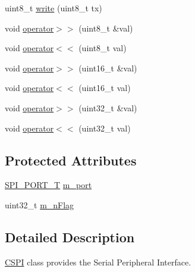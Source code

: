 \begin{DoxyCompactItemize}
\item 
uint8\-\_\-t \hyperlink{class_c_s_p_i_a2b91318925ae9de3f295abd2418285c4}{write} (uint8\-\_\-t tx)
\item 
void \hyperlink{class_c_s_p_i_a24ca202a0494b84a92ff56d10725ce40}{operator$>$$>$} (uint8\-\_\-t \&val)
\item 
void \hyperlink{class_c_s_p_i_a3ce438bee4e3c087e44b3cf2b1690ecd}{operator$<$$<$} (uint8\-\_\-t val)
\item 
void \hyperlink{class_c_s_p_i_ac53ab106be8d0f369b349f82b3db6813}{operator$>$$>$} (uint16\-\_\-t \&val)
\item 
void \hyperlink{class_c_s_p_i_a272f5e518d21194dbc996f5f5475ae02}{operator$<$$<$} (uint16\-\_\-t val)
\item 
void \hyperlink{class_c_s_p_i_aaf1a92290aaee5a93f8fc2db9ce4a512}{operator$>$$>$} (uint32\-\_\-t \&val)
\item 
void \hyperlink{class_c_s_p_i_a4d0cd48d0bba271fd72df43d7528e2a0}{operator$<$$<$} (uint32\-\_\-t val)
\end{DoxyCompactItemize}
\subsection*{Protected Attributes}
\begin{DoxyCompactItemize}
\item 
\hyperlink{group___enumerations_ga1adbe6bf70e3880dc6b9f86e58bb7f98}{S\-P\-I\-\_\-\-P\-O\-R\-T\-\_\-\-T} \hyperlink{class_c_s_p_i_a44669f2150e9312a3bd022c000574f81}{m\-\_\-port}
\item 
uint32\-\_\-t \hyperlink{class_c_s_p_i_a63f794ebd52c8a7402c1327cd84986ed}{m\-\_\-n\-Flag}
\end{DoxyCompactItemize}


\subsection{Detailed Description}
\hyperlink{class_c_s_p_i}{C\-S\-P\-I} class provides the Serial Peripheral Interface. 

